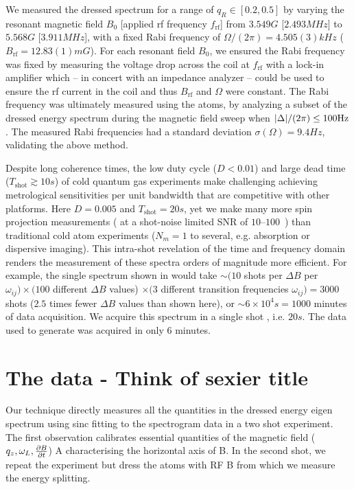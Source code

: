 \documentclass[aps,prl,reprint,superscriptaddress,floatfix]{revtex4-1}
\begin{document}
We measured the dressed spectrum for a range of $q_R \in [0.2, 0.5]$ by varying the resonant magnetic field $B_0$ [applied rf frequency $f_{\text{rf}}$] from $3.549\unit{G}$ [$2.493\unit{MHz}$] to $5.568\unit{G}$ [$3.911\unit{MHz}$], with a fixed Rabi frequency of $\Omega/(2\pi) = 4.505(3)\unit{kHz}$ ($B_{\text{rf}} = 12.83(1)\unit{mG}$).
For each resonant field $B_0$, we ensured the Rabi frequency was fixed by measuring the voltage drop across the coil at $f_{\text{rf}}$ with a lock-in amplifier which -- in concert with an impedance analyzer -- could be used to ensure the rf current in the coil and thus $B_{\text{rf}}$ and $\Omega$ were constant. 
The Rabi frequency was ultimately measured using the atoms, by analyzing a subset of the dressed energy spectrum during the magnetic field sweep when $\abs{\Delta}/(2\pi) \leq 100\unit{Hz}$.
The measured Rabi frequencies had a standard deviation $\sigma(\Omega) = 9.4\unit{Hz}$, validating the above method.

Despite long coherence times, the low duty cycle ($D < 0.01$) and large dead time ($T_\text{shot} \gtrsim 10\unit{s}$) of cold quantum gas experiments make challenging achieving metrological sensitivities per unit bandwidth that are competitive with other platforms.
Here $D=0.005$ and $T_\text{shot} = 20\unit{s}$, yet we make many more spin projection measurements ( at a shot-noise limited SNR of $10$--$100$~\cite{martijn_faraday_2017}) than traditional cold atom experiments ($N_m = 1$ to several, e.g. absorption or dispersive imaging).
This intra-shot revelation of the time and frequency domain renders the measurement of these spectra orders of magnitude more efficient.
For example, the single spectrum shown in  would take $\sim (10$ shots per $\Delta B$ per $\omega_{ij} ) \times (100$ different $\Delta B$ values) $\times (3 $ different transition frequencies $\omega_{ij}) = 3000$ shots ($2.5$ times fewer $\Delta B$ values than shown here), or $\sim 6\times10^4\unit{s} = 1000$ minutes of data acquisition.
We acquire this spectrum in a single shot , i.e. $20\unit{s}$.
The data used to generate  was acquired in only $6$ minutes.
  

\section{The data - Think of sexier title}
\label{sec:data}
Our technique directly measures all the quantities in the dressed energy eigen spectrum using sinc fitting to the spectrogram data in a two shot experiment. 
The first observation calibrates essential quantities of the magnetic field ($q_{z}, \omega_{L}, \frac{\partial B}{\partial t} $) A characterising the horizontal axis of B. In the second shot, we repeat the experiment but dress the atoms with RF B from which we measure the energy splitting. 



   
\end{document}
